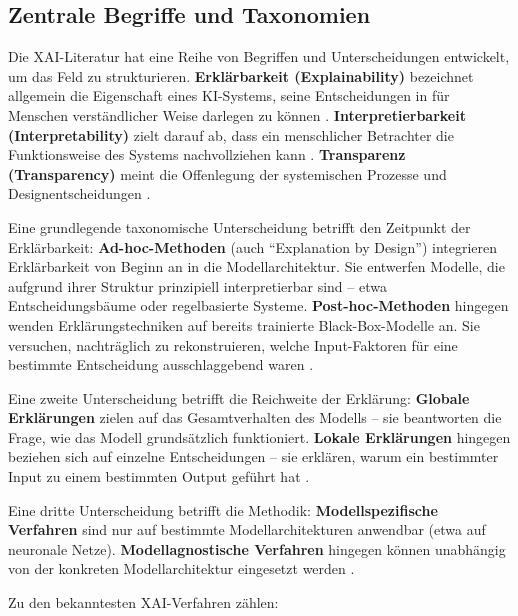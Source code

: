 \documentclass[
  12pt,
  a4paper,
  oneside,
  titlepage
]{article}
\begin{document}
\subsection{Zentrale Begriffe und Taxonomien}

Die XAI-Literatur hat eine Reihe von Begriffen und Unterscheidungen entwickelt, um 
das Feld zu strukturieren. \textbf{Erklärbarkeit (Explainability)} bezeichnet 
allgemein die Eigenschaft eines KI-Systems, seine Entscheidungen in für Menschen 
verständlicher Weise darlegen zu können \citep[ S.~89]{BarredoArrieta2020}. 
\textbf{Interpretierbarkeit (Interpretability)} zielt darauf ab, dass ein 
menschlicher Betrachter die Funktionsweise des Systems nachvollziehen kann 
\citep[ S.~25]{Weller2019}. \textbf{Transparenz (Transparency)} meint die 
Offenlegung der systemischen Prozesse und Designentscheidungen \citep[ S.~27]{Weller2019}.

Eine grundlegende taxonomische Unterscheidung betrifft den Zeitpunkt der 
Erklärbarkeit: \textbf{Ad-hoc-Methoden} (auch \enquote{Explanation by Design}) 
integrieren Erklärbarkeit von Beginn an in die Modellarchitektur. Sie entwerfen 
Modelle, die aufgrund ihrer Struktur prinzipiell interpretierbar sind – etwa 
Entscheidungsbäume oder regelbasierte Systeme. \textbf{Post-hoc-Methoden} hingegen 
wenden Erklärungstechniken auf bereits trainierte Black-Box-Modelle an. Sie 
versuchen, nachträglich zu rekonstruieren, welche Input-Faktoren für eine bestimmte 
Entscheidung ausschlaggebend waren \citep[ S.~92]{BarredoArrieta2020}.

Eine zweite Unterscheidung betrifft die Reichweite der Erklärung: 
\textbf{Globale Erklärungen} zielen auf das Gesamtverhalten des Modells – sie 
beantworten die Frage, wie das Modell grundsätzlich funktioniert. 
\textbf{Lokale Erklärungen} hingegen beziehen sich auf einzelne Entscheidungen – 
sie erklären, warum ein bestimmter Input zu einem bestimmten Output geführt hat 
\citep[ S.~80805]{Ortigossa2024}.

Eine dritte Unterscheidung betrifft die Methodik: \textbf{Modellspezifische Verfahren} 
sind nur auf bestimmte Modellarchitekturen anwendbar (etwa auf neuronale Netze). 
\textbf{Modellagnostische Verfahren} hingegen können unabhängig von der konkreten 
Modellarchitektur eingesetzt werden \citep[ S.~3]{Mersha2024}.

Zu den bekanntesten XAI-Verfahren zählen:
\end{document}
